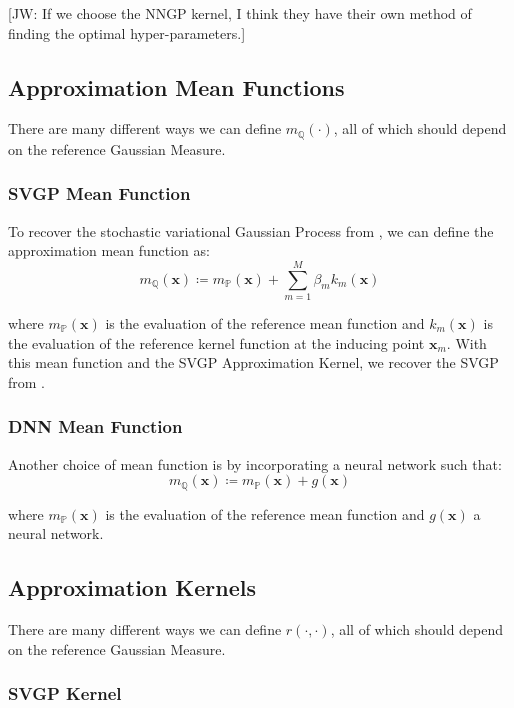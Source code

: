 \documentclass[twoside,11pt]{article}
\newcommand{\jw}[1]{{\color{gray} [JW: #1]}}
\begin{document}
\jw{If we choose the NNGP kernel, I think they have their own method of finding the optimal hyper-parameters.}

\subsection{Approximation Mean Functions}\label{subsec:approximation-mean-functions}
There are many different ways we can define $m_{\mathbb{Q}}(\cdot)$, all of which should depend on the reference Gaussian Measure.

\subsubsection{SVGP Mean Function}
To recover the stochastic variational Gaussian Process from \cite{titsias2009variational}, we can define the approximation mean function as:
\[m_{\mathbb{Q}}(\mathbf{x}) \coloneqq m_{\mathbb{P}}(\mathbf{x}) + \sum_{m=1}^{M} \beta_m k_m(\mathbf{x})\]

where $m_{\mathbb{P}}(\mathbf{x})$ is the evaluation of the reference mean function and $k_m(\mathbf{x})$ is the evaluation of the reference kernel function at the inducing point $\mathbf{x}_m$.
With this mean function and the SVGP Approximation Kernel, we recover the SVGP from \cite{titsias2009variational}.

\subsubsection{DNN Mean Function}

Another choice of mean function is by incorporating a neural network such that:
\[m_{\mathbb{Q}}(\mathbf{x}) \coloneqq m_{\mathbb{P}}(\mathbf{x}) + g(\mathbf{x})\]

where $m_{\mathbb{P}}(\mathbf{x})$ is the evaluation of the reference mean function and $g(\mathbf{x})$ a neural network.

\subsection{Approximation Kernels}\label{subsec:approximation-kernels}

There are many different ways we can define $r(\cdot, \cdot)$, all of which should depend on the reference Gaussian Measure.

\subsubsection{SVGP Kernel}
\end{document}

